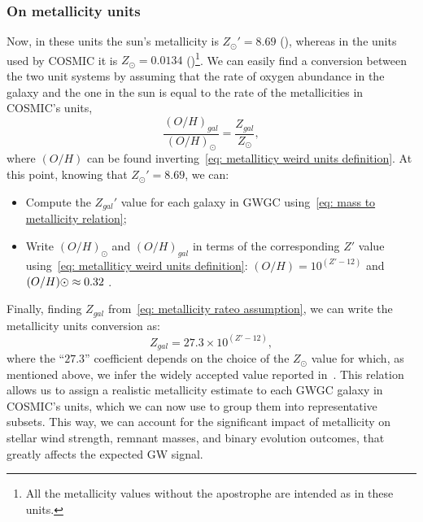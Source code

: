 \subsubsection{On metallicity units}
Now, in these units the sun's metallicity is $Z_\odot ' = 8.69$ ({\cite{AllendePrieto}}), whereas in the units used by COSMIC it is $Z_\odot=0.0134$ ({\cite{Asplund}})\footnote{All the metallicity values without the apostrophe are intended as in these units.}.
We can easily find a conversion between the two unit systems by assuming that the rate of oxygen abundance in the galaxy and the one in the sun is equal to the rate of the metallicities in COSMIC's units,
\begin{equation}
    \frac{{(O/H)}_{gal}}{{(O/H)}_\odot}=\frac{Z_{gal}}{Z_\odot},
    \label{eq: metallicity rateo assumption}
\end{equation}
where $(O/H)$ can be found inverting~\eqref{eq: metalliticy weird units definition}. 
At this point, knowing that $Z_\odot ' = 8.69$, we can:
\begin{itemize}
    \item Compute the $Z_{gal}'$ value for each galaxy in GWGC using~\eqref{eq: mass to metallicity relation};
    \item Write ${(O/H)}_\odot$ and ${(O/H)}_{gal}$ in terms of the corresponding  $Z'$ value using~\eqref{eq: metalliticy weird units definition}: $(O/H)=10^{(Z'-12)}$ and  $(O/H)\odot \approx 0.32\hspace{1mm}$. 
\end{itemize}
Finally, finding $Z_{gal}$ from~\eqref{eq: metallicity rateo assumption}, we can write the metallicity units conversion as:
\begin{equation}
    Z_{gal}=27.3\times10^{(Z'-12)},
\end{equation}
where the ``$27.3$'' coefficient depends on the choice of the $Z_\odot$ value for which, as mentioned above, we infer the widely accepted value reported in~\cite{Asplund}.
This relation allows us to assign a realistic metallicity estimate to each GWGC galaxy in COSMIC's units, which we can now use to group them into representative subsets. 
This way, we can account for the significant impact of metallicity on stellar wind strength, remnant masses, and binary evolution outcomes, that greatly affects the expected GW signal.



